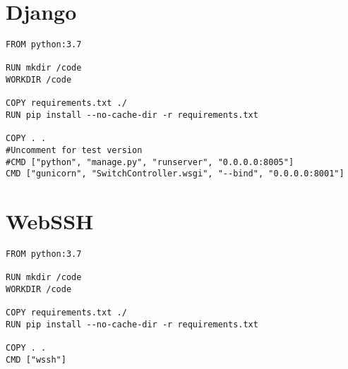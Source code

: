 \chapter{Django}
\label{app:django}
\begin{lstlisting}[language=docker,caption={Django Dockerfile},breaklines=true,label={code:django}]
FROM python:3.7

RUN mkdir /code
WORKDIR /code

COPY requirements.txt ./
RUN pip install --no-cache-dir -r requirements.txt

COPY . .
#Uncomment for test version
#CMD ["python", "manage.py", "runserver", "0.0.0.0:8005"]
CMD ["gunicorn", "SwitchController.wsgi", "--bind", "0.0.0.0:8001"]

\end{lstlisting}

\chapter{WebSSH}
\label{app:webssh}
\begin{lstlisting}[language=docker,caption={WebSSH Dockerfile},breaklines=true,label={code:webssh}]
FROM python:3.7
 
RUN mkdir /code
WORKDIR /code
 
COPY requirements.txt ./
RUN pip install --no-cache-dir -r requirements.txt

COPY . .
CMD ["wssh"]
\end{lstlisting}
